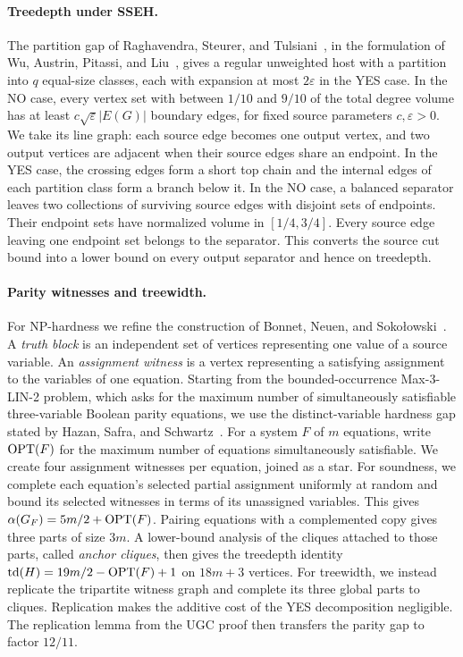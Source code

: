 \paragraph{Treedepth under \textup{SSEH}.}
The partition gap of Raghavendra, Steurer, and
Tulsiani~\cite{RST}, in the formulation of Wu, Austrin, Pitassi, and
Liu~\cite[Section~2.5]{APW}, gives a regular unweighted host with a
partition into $q$ equal-size classes, each with expansion at most
$2\varepsilon$ in the YES case. In
the NO case, every vertex set with between $1/10$ and $9/10$ of the
total degree volume has at least
$c\sqrt{\varepsilon}|E(G)|$ boundary edges, for fixed source
parameters $c,\varepsilon>0$. We take its line graph: each source edge
becomes one output vertex, and two output vertices are adjacent
when their source edges share an endpoint.
In the YES case, the crossing edges form a short top chain and
the internal edges of each partition class form a branch below it.
In the NO case, a balanced separator leaves two collections of
surviving source edges with disjoint sets of endpoints.
Their endpoint sets have normalized volume in $[1/4,3/4]$.
Every source edge leaving one endpoint set belongs to the separator.
This converts the source cut bound into a lower bound on every output
separator and hence on treedepth.

\paragraph{Parity witnesses and treewidth.}
For \textup{NP}-hardness we refine the construction of Bonnet, Neuen, and
Soko\l owski~\cite{BNS}. A \emph{truth block} is an independent
set of vertices representing one value of a source variable. An
\emph{assignment witness} is a vertex representing a satisfying
assignment to the variables of one equation. Starting from
the bounded-occurrence Max-3-LIN-2 problem, which asks for the maximum
number of simultaneously satisfiable three-variable Boolean parity
equations, we use the distinct-variable hardness gap stated by Hazan,
Safra, and Schwartz~\cite[Theorem~10]{HazanSafraSchwartz2003}. For a system $F$
of $m$ equations, write $\operatorname{OPT}(F)$ for the maximum number of equations
simultaneously satisfiable. We create four
assignment witnesses per equation, joined as a star. For soundness,
we complete each equation's selected partial assignment uniformly at
random and bound its selected witnesses in terms of its unassigned
variables. This gives
$\alpha(G_F)=5m/2+\operatorname{OPT}(F)$. Pairing equations with a complemented
copy gives three parts of size $3m$. A lower-bound analysis of the
cliques attached to those parts, called \emph{anchor cliques}, then
gives the treedepth identity
$\operatorname{td}(H)=19m/2-\operatorname{OPT}(F)+1$
on $18m+3$ vertices. For treewidth, we instead replicate the
tripartite witness graph and complete its three global parts to
cliques. Replication makes the additive cost of the YES
decomposition negligible. The replication lemma from the \textup{UGC} proof
then transfers the parity gap to factor $12/11$.

